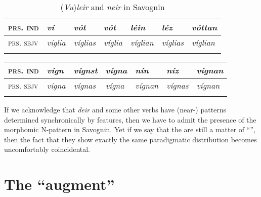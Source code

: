 \documentclass[output=paper,
modfonts
]{LSP/langsci}
\begin{document}

\begin{longtable}[]{@{}lllllll@{}}
\caption{(\emph{Vu})\emph{leir} and \emph{neir} in Savognin}\\
\lsptoprule
\textsc{prs. ind} & \emph{ví} & \emph{vót} & \emph{vót} & \emph{léin} &
\emph{léz} & \emph{vóttan}\tabularnewline
\midrule
\endhead
\textsc{prs. sbjv} & \emph{víglia} & \emph{víglias} & \emph{víglia} &
\emph{víglian} & \emph{víglias} & \emph{víglian}\tabularnewline
\lspbottomrule
\end{longtable}\addtocounter{table}{-1}

\begin{longtable}[]{@{}lllllll@{}}
\lsptoprule
\textsc{prs. ind} & \emph{vígn} & \emph{vígnst} & \emph{vígna} &
\emph{nín} & \emph{níz} & \emph{vígnan}\tabularnewline
\midrule
\endhead
\textsc{prs. sbjv} & \emph{vígna} & \emph{vígnas} & \emph{vígna} &
\emph{vígnan} & \emph{vígnas} & \emph{vígnan}\tabularnewline
\lspbottomrule
\end{longtable}

If we acknowledge that \emph{deir} and some other verbs have
(near-) patterns determined synchronically by 
features, then we have to admit the presence of the morphomic N-pattern
in Savognin. Yet if we say that the  are still a
matter of ``'', then the fact that
they show exactly the same paradigmatic distribution becomes
uncomfortably coincidental.

\section{The ``augment''}\label{the-augment}
\end{document}
